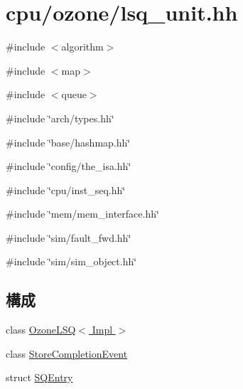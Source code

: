 \hypertarget{ozone_2lsq__unit_8hh}{
\section{cpu/ozone/lsq\_\-unit.hh}
\label{ozone_2lsq__unit_8hh}
}
{\ttfamily \#include $<$algorithm$>$}\par
{\ttfamily \#include $<$map$>$}\par
{\ttfamily \#include $<$queue$>$}\par
{\ttfamily \#include \char`\"{}arch/types.hh\char`\"{}}\par
{\ttfamily \#include \char`\"{}base/hashmap.hh\char`\"{}}\par
{\ttfamily \#include \char`\"{}config/the\_\-isa.hh\char`\"{}}\par
{\ttfamily \#include \char`\"{}cpu/inst\_\-seq.hh\char`\"{}}\par
{\ttfamily \#include \char`\"{}mem/mem\_\-interface.hh\char`\"{}}\par
{\ttfamily \#include \char`\"{}sim/fault\_\-fwd.hh\char`\"{}}\par
{\ttfamily \#include \char`\"{}sim/sim\_\-object.hh\char`\"{}}\par
\subsection*{構成}
\begin{DoxyCompactItemize}
\item 
class \hyperlink{classOzoneLSQ}{OzoneLSQ$<$ Impl $>$}
\item 
class \hyperlink{classOzoneLSQ_1_1StoreCompletionEvent}{StoreCompletionEvent}
\item 
struct \hyperlink{structOzoneLSQ_1_1SQEntry}{SQEntry}
\end{DoxyCompactItemize}
